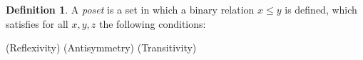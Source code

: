\documentclass{article}
\theoremstyle{definition}
\newtheorem{definition}{Definition}[section]
\begin{document}
\begin{definition}
    A \emph{poset} is a set in which a binary relation $x \le y $ is
    defined, which
    satisfies for all $x, y, z $ the following conditions:

    \begin{axiomata}[P]
         {(Reflexivity)}
         {(Antisymmetry)}
         {(Transitivity)}
    \end{axiomata}

\end{definition}
\end{document}
